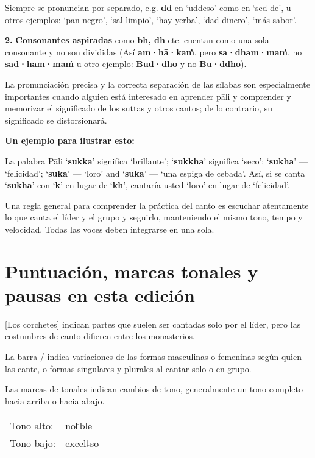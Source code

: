 Siempre se pronuncian por separado, e.g. \textbf{dd} en ‘uddeso’ como en
 ‘sed-de’, u otros ejemplos: ‘pan-negro’, ‘sal-limpio’, ‘hay-yerba’, ‘dad-dinero’, ‘más-sabor’.

\textbf{2.} \textbf{Consonantes aspiradas} como \textbf{bh, dh} etc.
cuentan como una sola consonante y no son divididas (Así
\textbf{am·hā·kaṁ}, pero \textbf{sa·dham·maṁ}, no \textbf{sad·ham·maṁ}
u otro ejemplo: \textbf{Bud·dho} y no \textbf{Bu·ddho}).

La pronunciación precisa y la correcta separación de las sílabas son especialmente importantes cuando alguien está interesado en aprender pāli y comprender y memorizar el significado de los suttas y otros cantos; de lo contrario, su significado se distorsionará.


\textbf{Un ejemplo para ilustrar esto:}

La palabra Pāli ‘\textbf{sukka}’ significa ‘brillante’; ‘\textbf{sukkha}’ significa
‘seco’; ‘\textbf{sukha}’ --- ‘felicidad’; ‘\textbf{suka}’ --- ‘loro’ and
‘\textbf{sūka}’ --- ‘una espiga de cebada’.
Así, si se canta ‘\textbf{sukha}’ con ‘\textbf{k}’ en lugar de
‘\textbf{kh}’, cantaría usted ‘loro’ en lugar de ‘felicidad’.

Una regla general para comprender la práctica del canto es escuchar atentamente lo que canta el líder y el grupo y seguirlo, manteniendo el mismo tono, tempo y velocidad. Todas las voces deben integrarse en una sola.

\section{Puntuación, marcas tonales y pausas en esta edición}

[Los corchetes] indican partes que suelen ser cantadas solo por el líder, pero las costumbres de canto difieren entre los monasterios.

La barra / indica variaciones de las formas masculinas o femeninas según quien las cante, o formas singulares y plurales al cantar solo o en grupo.

Las marcas de tonales indican cambios de tono, generalmente un tono completo hacia arriba o hacia abajo.

\begin{tabular}{llll}
	Tono alto: & no꜓ble \\
	Tono bajo: & excel꜕so \\
\end{tabular}

%
